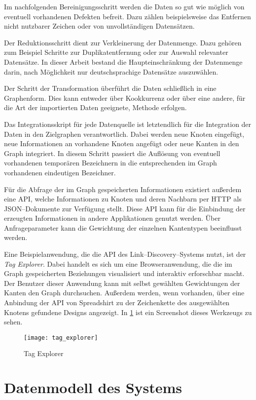 Im nachfolgenden Bereinigungsschritt werden die Daten so gut wie möglich von eventuell vorhandenen Defekten befreit. Dazu zählen beispielsweise das Entfernen nicht nutzbarer Zeichen oder von unvollständigen Datensätzen.

Der Reduktionsschritt dient zur Verkleinerung der Datenmenge. Dazu gehören zum Beispiel Schritte zur Duplikatentfernung oder zur Auswahl relevanter Datensätze. In dieser Arbeit bestand die Haupteinschränkung der Datenmenge darin, nach Möglichkeit nur deutschsprachige Datensätze auszuwählen.

Der Schritt der Transformation überführt die Daten schließlich in eine Graphenform. Dies kann entweder über Kookkurrenz oder über eine andere, für die Art der importierten Daten geeignete, Methode erfolgen.

Das Integrationsskript für jede Datenquelle ist letztendlich für die Integration der Daten in den Zielgraphen verantwortlich. Dabei werden neue Knoten eingefügt, neue Informationen an vorhandene Knoten angefügt oder neue Kanten in den Graph integriert. In diesem Schritt passiert die Auflösung von eventuell vorhandenen temporären Bezeichnern in die entsprechenden im Graph vorhandenen eindeutigen Bezeichner.

Für die Abfrage der im Graph gespeicherten Informationen existiert außerdem eine API, welche Informationen zu Knoten und deren Nachbarn per HTTP als JSON--Dokumente zur Verfügung stellt. Diese API kann für die Einbindung der erzeugten Informationen in andere Applikationen genutzt werden. Über Anfrageparameter kann die Gewichtung der einzelnen Kantentypen beeinflusst werden.

Eine Beispielanwendung, die die API des Link--Discovery--Systems nutzt, ist der \emph{Tag Explorer}. Dabei handelt es sich um eine Browseranwendung, die die im Graph gespeicherten Beziehungen visualisiert und interaktiv erforschbar macht. Der Benutzer dieser Anwendung kann mit selbst gewählten Gewichtungen der Kanten den Graph durchsuchen. Außerdem werden, wenn vorhanden, über eine Anbindung der API von Spreadshirt zu der Zeichenkette des ausgewählten Knotens gefundene Designs angezeigt. In \cref{fig:tag_explorer} ist ein Screenshot dieses Werkzeugs zu sehen.

\begin{figure}
\centering
\texttt{[image: tag\_explorer]}
\caption{Tag Explorer}
\label{fig:tag_explorer}
\end{figure}

\section{Datenmodell des Systems}

